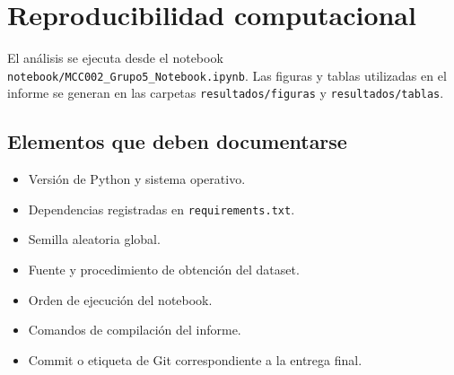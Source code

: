 \section{Reproducibilidad computacional}
\label{anexo:reproducibilidad}

El análisis se ejecuta desde el notebook
\texttt{notebook/MCC002\_Grupo5\_Notebook.ipynb}. Las figuras y tablas
utilizadas en el informe se generan en las carpetas
\texttt{resultados/figuras} y \texttt{resultados/tablas}.

\subsection*{Elementos que deben documentarse}

\begin{itemize}
    \item Versión de Python y sistema operativo.
    \item Dependencias registradas en \texttt{requirements.txt}.
    \item Semilla aleatoria global.
    \item Fuente y procedimiento de obtención del dataset.
    \item Orden de ejecución del notebook.
    \item Comandos de compilación del informe.
    \item Commit o etiqueta de Git correspondiente a la entrega final.
\end{itemize}
